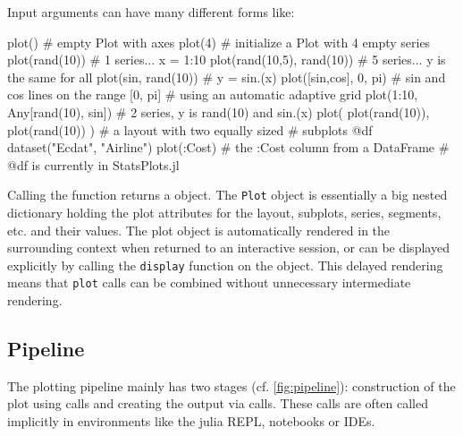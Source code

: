 Input arguments can have many different forms like:
%
\begin{code}
plot()                                       # empty Plot with axes
plot(4)                                      # initialize a Plot with 4 empty series
plot(rand(10))                               # 1 series... x = 1:10
plot(rand(10,5), rand(10))                   # 5 series... y is the same for all
plot(sin, rand(10))                          # y = sin.(x)
plot([sin,cos], 0, pi)                       # sin and cos lines on the range [0, pi]
                                             # using an automatic adaptive grid
plot(1:10, Any[rand(10), sin])               # 2 series, y is rand(10) and sin.(x)
plot( plot(rand(10)), plot(rand(10)) )       # a layout with two equally sized
                                             # subplots
@df dataset("Ecdat", "Airline") plot(:Cost)  # the :Cost column from a DataFrame
                                             # @df is currently in StatsPlots.jl
\end{code}
%
Calling the  function returns a  object.
The \texttt{Plot} object is essentially a big nested dictionary holding the plot attributes for the layout, subplots, series, segments, etc. and their values.
The plot object is automatically rendered in the surrounding context when returned to an interactive session, or can be displayed explicitly by calling the \texttt{display} function on the object.
This delayed rendering means that \texttt{plot} calls can be combined without unnecessary intermediate rendering.

\subsection*{Pipeline}

The plotting pipeline mainly has two stages (cf. \cref{fig:pipeline}): construction of the plot using  calls and creating the output via  calls.
These calls are often called implicitly in environments like the julia REPL, notebooks or IDEs.

